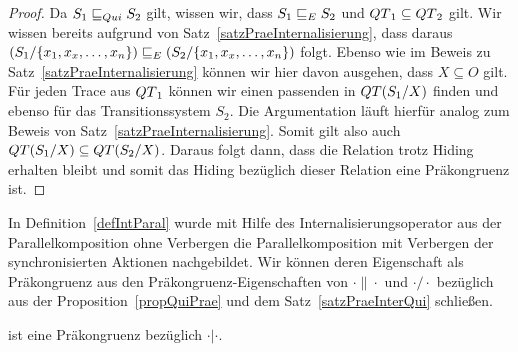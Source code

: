 \begin{proof}
  Da $S_1\sqsubseteq _{Qui} S_2$ gilt, wissen wir, dass $S_1\sqsubseteq _E S_2$ und $QT{}_1\subseteq
  QT{}_2$ gilt. Wir wissen bereits aufgrund von
  Satz~\ref{satzPraeInternalisierung}, dass daraus $(S_1/\{x_1,x_x,\dots
  ,x_n\})\sqsubseteq _E (S_2/\{x_1,x_x,\dots ,x_n\})$ folgt. Ebenso wie im Beweis zu
  Satz~\ref{satzPraeInternalisierung} können wir hier davon ausgehen, dass
  $X\subseteq O$ gilt. Für jeden Trace aus $QT{}_1$ können wir einen passenden in
  $QT{}(S_1/X)$ finden und ebenso für das Transitionssystem $S_2$. Die
  Argumentation läuft hierfür analog zum Beweis von
  Satz~\ref{satzPraeInternalisierung}. Somit gilt
  also auch $QT{}(S_1/X)\subseteq QT{}(S_2/X)$. Daraus folgt dann, dass die
  Relation \QRel{} trotz Hiding erhalten bleibt und somit das Hiding bezüglich
  dieser Relation eine Präkongruenz ist.
\end{proof}

In Definition~\ref{defIntParal} wurde mit Hilfe des Internalisierungsoperator
aus der Parallelkomposition ohne Verbergen die Parallelkomposition mit
Verbergen der synchronisierten Aktionen nachgebildet. Wir können deren
Eigenschaft als Präkongruenz aus den Präkongruenz-Eigenschaften von
$\cdot\|\cdot$ und $\cdot /\cdot$ bezüglich \QRel{} aus der
Proposition~\ref{propQuiPrae} und dem Satz~\ref{satzPraeInterQui} schließen.

\begin{kor}
  \QRel{} ist eine Präkongruenz bezüglich $\cdot |\cdot$.
\end{kor}
